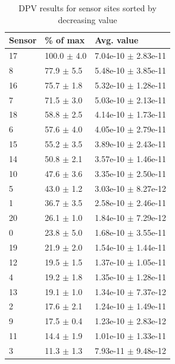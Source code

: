 \begin{table}
	\begin{tabular}{lll}
		Sensor & \% of max & Avg. value \\
		\hline
		17 & 100.0 $\pm$ 4.0 & 7.04e-10 $\pm$ 2.83e-11 \\
		8 & 77.9 $\pm$ 5.5 & 5.48e-10 $\pm$ 3.85e-11 \\
		16 & 75.7 $\pm$ 1.8 & 5.32e-10 $\pm$ 1.28e-11 \\
		7 & 71.5 $\pm$ 3.0 & 5.03e-10 $\pm$ 2.13e-11 \\
		18 & 58.8 $\pm$ 2.5 & 4.14e-10 $\pm$ 1.73e-11 \\
		6 & 57.6 $\pm$ 4.0 & 4.05e-10 $\pm$ 2.79e-11 \\
		15 & 55.2 $\pm$ 3.5 & 3.89e-10 $\pm$ 2.43e-11 \\
		14 & 50.8 $\pm$ 2.1 & 3.57e-10 $\pm$ 1.46e-11 \\
		10 & 47.6 $\pm$ 3.6 & 3.35e-10 $\pm$ 2.50e-11 \\
		5 & 43.0 $\pm$ 1.2 & 3.03e-10 $\pm$ 8.27e-12 \\
		1 & 36.7 $\pm$ 3.5 & 2.58e-10 $\pm$ 2.46e-11 \\
		20 & 26.1 $\pm$ 1.0 & 1.84e-10 $\pm$ 7.29e-12 \\
		0 & 23.8 $\pm$ 5.0 & 1.68e-10 $\pm$ 3.55e-11 \\
		19 & 21.9 $\pm$ 2.0 & 1.54e-10 $\pm$ 1.44e-11 \\
		12 & 19.5 $\pm$ 1.5 & 1.37e-10 $\pm$ 1.05e-11 \\
		4 & 19.2 $\pm$ 1.8 & 1.35e-10 $\pm$ 1.28e-11 \\
		13 & 19.1 $\pm$ 1.0 & 1.34e-10 $\pm$ 7.37e-12 \\
		2 & 17.6 $\pm$ 2.1 & 1.24e-10 $\pm$ 1.49e-11 \\
		9 & 17.5 $\pm$ 0.4 & 1.23e-10 $\pm$ 2.83e-12 \\
		11 & 14.4 $\pm$ 1.9 & 1.01e-10 $\pm$ 1.33e-11 \\
		3 & 11.3 $\pm$ 1.3 & 7.93e-11 $\pm$ 9.48e-12
	\end{tabular}
	\caption[DPV results for sensor sites]{DPV results for sensor sites sorted by decreasing value}
	\label{dpv-results}
\end{table}

